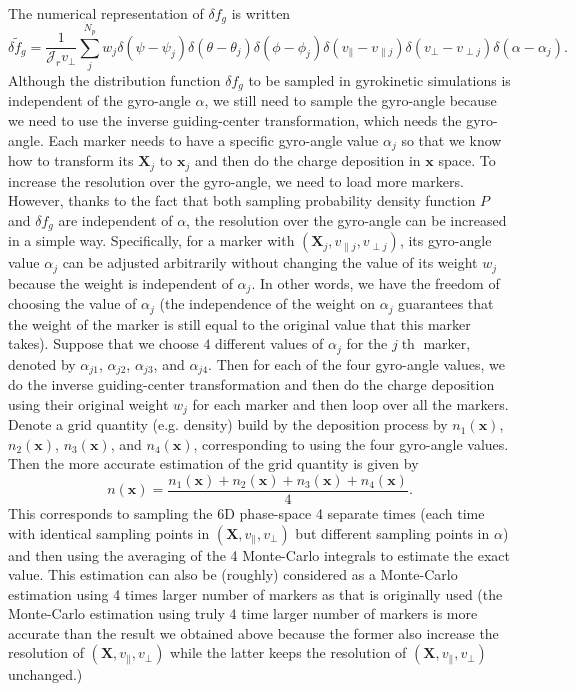 \documentclass{llncs}
\newcommand{\tmop}[1]{\ensuremath{\operatorname{#1}}}
\begin{document}
The numerical representation of $\delta f_g$ is written
\begin{equation}
  \delta \tilde{f}_g = \frac{1}{\mathcal{J}_r v_{\perp}} \sum_j^{N_p} w_j
  \delta (\psi - \psi_j) \delta (\theta - \theta_j) \delta (\phi - \phi_j)
  \delta (v_{\parallel} - v_{\parallel j}) \delta (v_{\perp} - v_{\perp j})
  \delta (\alpha - \alpha_j) .
\end{equation}
Although the distribution function $\delta f_g$ to be sampled in gyrokinetic
simulations is independent of the gyro-angle $\alpha$, we still need to sample
the gyro-angle because we need to use the inverse guiding-center
transformation, which needs the gyro-angle. Each marker needs to have a
specific gyro-angle value $\alpha_j$ so that we know how to transform its
$\mathbf{X}_j$ to $\mathbf{x}_j$ and then do the charge deposition in
$\mathbf{x}$ space. To increase the resolution over the gyro-angle, we need to
load more markers. However, thanks to the fact that both sampling probability
density function $P$ and $\delta f_g$ are independent of $\alpha$, the
resolution over the gyro-angle can be increased in a simple way. Specifically,
for a marker with $(\mathbf{X}_j, v_{\parallel j}, v_{\perp j})$, its
gyro-angle value $\alpha_j$ can be adjusted arbitrarily without changing the
value of its weight $w_j$ because the weight is independent of $\alpha_j$. In
other words, we have the freedom of choosing the value of $\alpha_j$ (the
independence of the weight on $\alpha_j$ guarantees that the weight of the
marker is still equal to the original value that this marker takes). Suppose
that we choose $4$ different values of $\alpha_j$ for the $j \tmop{th}$
marker, denoted by $\alpha_{j 1}$, $\alpha_{j 2}$, $\alpha_{j 3}$, and
$\alpha_{j 4}$. Then for each of the four gyro-angle values, we do the inverse
guiding-center transformation and then do the charge deposition using their
original weight $w_j$ for each marker and then loop over all the markers.
Denote a grid quantity (e.g. density) build by the deposition process by $n_1
(\mathbf{x})$, $n_2 (\mathbf{x})$, $n_3 (\mathbf{x})$, and $n_4 (\mathbf{x})$,
corresponding to using the four gyro-angle values. Then the more accurate
estimation of the grid quantity is given by
\begin{equation}
  n (\mathbf{x}) = \frac{n_1 (\mathbf{x}) + n_2 (\mathbf{x}) + n_3
  (\mathbf{x}) + n_4 (\mathbf{x})}{4} .
\end{equation}
This corresponds to sampling the 6D phase-space 4 separate times (each time
with identical sampling points in $(\mathbf{X}, v_{\parallel}, v_{\perp})$ but
different sampling points in $\alpha$) and then using the averaging of the 4
Monte-Carlo integrals to estimate the exact value. This estimation can also be
(roughly) considered as a Monte-Carlo estimation using 4 times larger number
of markers as that is originally used (the Monte-Carlo estimation using truly
4 time larger number of markers is more accurate than the result we obtained
above because the former also increase the resolution of $(\mathbf{X},
v_{\parallel}, v_{\perp})$ while the latter keeps the resolution of
$(\mathbf{X}, v_{\parallel}, v_{\perp})$ unchanged.)
\end{document}
